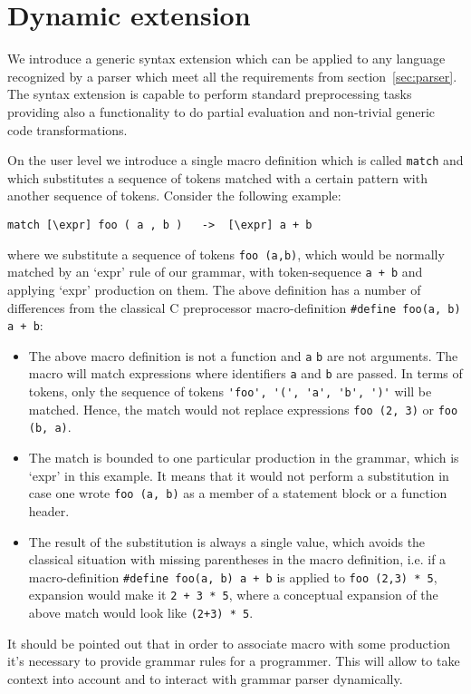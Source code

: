 \section{Dynamic extension}

We introduce a generic syntax extension which can be applied to any
language recognized by a parser which meet all the requirements from
section~\ref{sec:parser}.  The syntax extension is capable to perform
standard preprocessing tasks providing also a functionality to do
partial evaluation and non-trivial generic code transformations.

On the user level we introduce a single macro definition which is called 
\verb|match| and which substitutes a sequence of tokens matched
with a certain pattern with another sequence of tokens.  
Consider the following example:
\begin{verbatim}
match [\expr] foo ( a , b )   ->  [\expr] a + b
\end{verbatim}
where we substitute a sequence of tokens \verb|foo (a,b)|, which would 
be normally matched by an `expr' rule of our grammar, with
token-sequence \verb|a + b| and applying `expr' production on them.
The above definition has a number of differences from the 
classical C preprocessor macro-definition \verb|#define foo(a, b) a + b|:
\begin{itemize}
  \item The above macro definition is not a function and \verb|a|
  \verb|b| are not arguments. The macro will match expressions where
  identifiers \verb|a| and \verb|b| are passed. In terms of tokens, only
  the sequence of tokens \verb|'foo', '(', 'a', 'b', ')'| will be
  matched.  Hence, the match would not replace expressions 
  \verb|foo (2, 3)| or \verb|foo (b, a)|. 
  \item The match is bounded to one particular production in the
  grammar, which is `expr' in this example.  It means that it would not
  perform a substitution in case one wrote \verb|foo (a, b)| as a member
  of a statement block or a function header.
  \item The result of the substitution is always a single value, which avoids 
  the classical situation with missing parentheses in the macro definition, 
  i.e. if a macro-definition \verb|#define foo(a, b) a + b| is applied to 
  \verb|foo (2,3) * 5|, expansion would make it \verb|2 + 3 * 5|, where
  a conceptual expansion of the above match would look like \verb|(2+3) * 5|.
\end{itemize}
It should be pointed out that in order to associate macro with some production
it's necessary to provide grammar rules for a programmer. This will allow to
take context into account and to interact with grammar parser dynamically.


